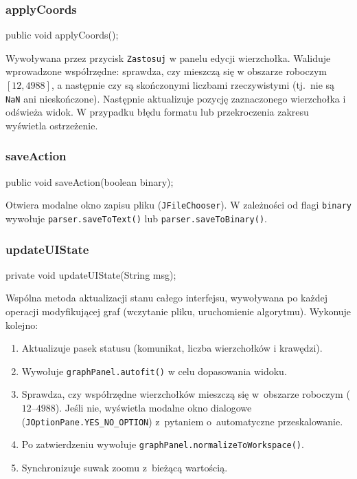 \documentclass[a4paper, 11pt]{article}
\begin{document}
\subsubsection{applyCoords}

\begin{cmdbox}
public void applyCoords();
\end{cmdbox}

Wywoływana przez przycisk \texttt{Zastosuj} w panelu edycji wierzchołka.
Waliduje wprowadzone współrzędne: sprawdza, czy mieszczą się w obszarze
roboczym $[12, 4988]$, a następnie czy są skończonymi liczbami
rzeczywistymi (tj.\ nie są \texttt{NaN} ani nieskończone).
Następnie aktualizuje pozycję zaznaczonego wierzchołka i odświeża widok.
W przypadku błędu formatu lub przekroczenia zakresu wyświetla ostrzeżenie.

\subsubsection{saveAction}

\begin{cmdbox}
public void saveAction(boolean binary);
\end{cmdbox}

Otwiera modalne okno zapisu pliku (\texttt{JFileChooser}).
W zależności od flagi \texttt{binary} wywołuje \texttt{parser.saveToText()}
lub \texttt{parser.saveToBinary()}.

\subsubsection{updateUIState}

\begin{cmdbox}
private void updateUIState(String msg);
\end{cmdbox}

Wspólna metoda aktualizacji stanu całego interfejsu, wywoływana po każdej
operacji modyfikującej graf (wczytanie pliku, uruchomienie algorytmu).
Wykonuje kolejno:
\begin{enumerate}
  \item Aktualizuje pasek statusu (komunikat, liczba wierzchołków i krawędzi).
  \item Wywołuje \texttt{graphPanel.autofit()} w celu dopasowania widoku.
  \item Sprawdza, czy współrzędne wierzchołków mieszczą się w~obszarze roboczym ($12$--$4988$). Jeśli nie, wyświetla modalne okno dialogowe (\texttt{JOptionPane.YES\_NO\_OPTION}) z~pytaniem o~automatyczne przeskalowanie.
  \item Po zatwierdzeniu wywołuje \texttt{graphPanel.normalizeToWorkspace()}.
  \item Synchronizuje suwak zoomu z~bieżącą wartością.
\end{enumerate}
\end{document}
